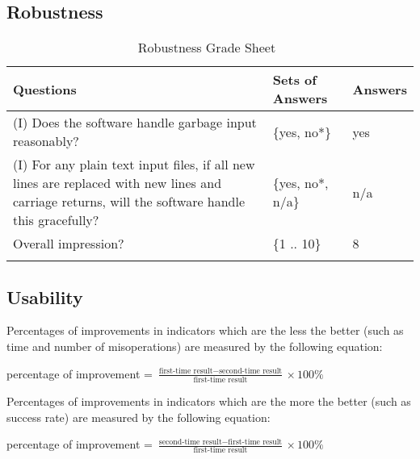 \documentclass[12pt, titlepage]{article}
\begin{document}
\subsection{Robustness}
\label{sec_Robustness}

\begin{longtable}{p{10cm} l l}
\toprule
Questions & Sets of Answers & Answers\\
\midrule

(I) Does the software handle garbage input reasonably? & \{yes, no*\} & yes\\
(I) For any plain text input files, if all new lines are replaced with new
lines and carriage returns, will the software handle this gracefully? & \{yes,
no*,
n/a\} & n/a\\
Overall impression? & \{1 .. 10\} & 8\\
\bottomrule
\caption{Robustness Grade Sheet~\cite{SmithEtAl2018}}
\label{Tb_robustness}
\end{longtable}

\subsection{Usability}
\label{sec_Usability}

Percentages of improvements in indicators which are the less the better (such
as time and number of misoperations) are measured by the following equation:

percentage of improvement = $\frac{\text{first-time result} - \text{second-time
result}}{\text{first-time result}} \times 100\%$

Percentages of improvements in indicators which are the more the better (such
as success rate) are measured by the following equation:

percentage of improvement = $\frac{\text{second-time result} - \text{first-time
result}}{\text{first-time result}} \times 100\%$
\end{document}
